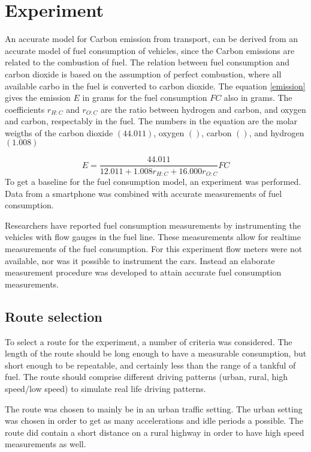 \section{Experiment}
An accurate model for Carbon emission from transport, can be derived from an accurate model of fuel consumption of vehicles, since the Carbon emissions are related to the combustion of fuel. The relation between fuel consumption and carbon dioxide is based on the assumption of perfect combustion, where all available carbo in the fuel is converted to carbon dioxide. The equation \ref{emission} gives the emission $E$ in grams for the fuel consumption $FC$ also in grams. The coefficients $r_{H:C}$ and $r_{O:C}$ are the ratio between hydrogen and carbon, and   oxygen and carbon, respectably in the fuel. The numbers in the equation are the molar weigths of the carbon dioxide $(44.011)$, oxygen $()$, carbon $()$, and hydrogen $(1.008)$

\begin{equation}
     E = \frac{44.011}{12.011+1.008 r_{H:C}+16.000 r_{O:C}} FC
     \label{emission}
\end{equation}
To get a baseline for the fuel consumption model, an experiment was performed. Data from a smartphone was combined with accurate measurements of fuel consumption. 

Researchers have reported fuel consumption measurements by instrumenting the vehicles with flow gauges in the fuel line. These measurements allow for realtime measurements of the fuel consumption. For this experiment flow meters were not available, nor was it possible to instrument the cars. Instead an elaborate measurement procedure was developed to attain accurate fuel consumption measurements.

\subsection{Route selection}
To select a route for the experiment, a number of criteria was considered. The length of the route should be long enough to have a measurable consumption, but short enough to be repeatable, and certainly less than the range of a tankful of fuel. The route should comprise different driving patterns (urban, rural, high speed/low speed) to simulate real life driving patterns. 

The route was chosen to mainly be in an urban traffic setting. The urban setting was chosen in order to get as many accelerations and idle periods a possible. The route did contain a short distance on a rural highway in order to have high speed measurements as well.

